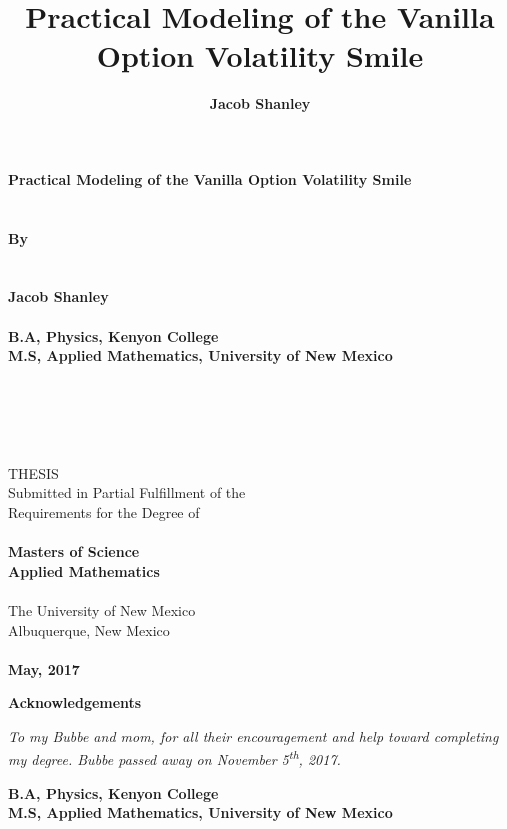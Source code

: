 \documentclass[12pt, a4paper, notitlepage]{article}
\title{\textbf{Practical Modeling of the Vanilla Option Volatility Smile}}
\author{\textbf{Jacob Shanley}}
\date{\vspace{-5ex}}
\numberwithin{equation}{subsection}
\numberwithin{figure}{subsection}
\numberwithin{table}{subsection}
\begin{document}

\thispagestyle{empty}
\begin{center}
    	\textbf
        {
        	\large
    		Practical Modeling of the Vanilla Option Volatility Smile \\~\\~\\
    		By \\~\\~\\
    		Jacob Shanley
            \normalsize
            \\~\\ 
            B.A, Physics, Kenyon College \\
			M.S, Applied Mathematics, University of New Mexico
    	}
        \\~\\~\\~\\~\\~\\
        THESIS \\
        Submitted in Partial Fulfillment of the \\
        Requirements for the Degree of \\~\\
        \textbf
        {
        	Masters of Science \\
            Applied Mathematics
        }
        \\~\\
        The University of New Mexico \\
        Albuquerque, New Mexico
        \\~\\
        \textbf
        {
        	May, 2017
        }
\end{center}

\newpage
\begin{center}
	\large \textbf{Acknowledgements}
\end{center}

\newpage
\vspace*{\fill}
\begin{center}
	\textit{To my Bubbe and mom, for all their encouragement and help toward completing my degree.  Bubbe passed away on November 5\textsuperscript{th}, 2017.}
\end{center}
\vspace*{\fill}

\maketitle
\begin{center}
	\textbf
    {
    	B.A, Physics, Kenyon College \\
		M.S, Applied Mathematics, University of New Mexico
    }
\end{center}
\end{document}
